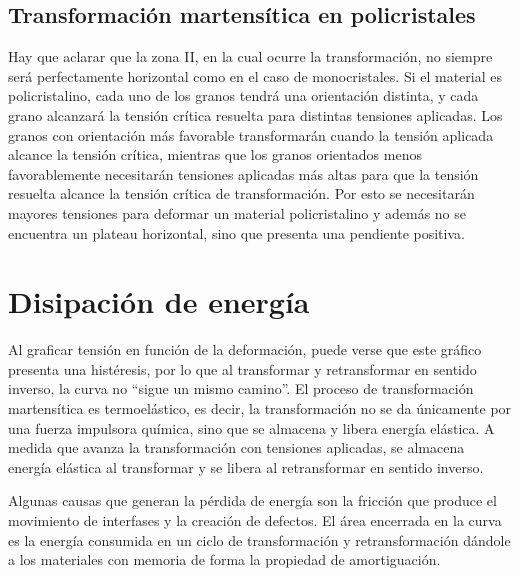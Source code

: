 \documentclass[a4paper,12pt,fleqn,twoside,openany]{book}
\begin{document}
\subsection{Transformación martensítica en policristales}
Hay que aclarar que la zona II, en la cual ocurre la transformación, no siempre será perfectamente horizontal como en el caso de monocristales. 
Si el material es policristalino, cada uno de los granos tendrá una orientación distinta, y cada grano alcanzará la tensión crítica resuelta para distintas tensiones aplicadas. Los granos con orientación más favorable transformarán cuando la tensión aplicada alcance la tensión crítica, mientras que los granos orientados menos favorablemente necesitarán tensiones aplicadas más altas para que la tensión resuelta alcance la tensión crítica de transformación. Por esto se necesitarán mayores tensiones para deformar un material policristalino y además no se encuentra un plateau horizontal, sino que presenta una pendiente positiva.


\section{Disipación de energía}

Al graficar tensión en función de la deformación, puede verse que este gráfico presenta una histéresis, por lo que al transformar y 
retransformar en sentido inverso, la curva no “sigue un mismo camino”. El proceso de transformación martensítica es termoelástico, es decir, la transformación 
no se da únicamente por una fuerza impulsora química, sino que se almacena y libera energía elástica. A medida que avanza la transformación con tensiones aplicadas, 
se almacena energía elástica al transformar y se libera al retransformar en sentido inverso. 

Algunas causas que generan la pérdida de energía son la fricción que produce el 
movimiento de interfases y la creación de defectos. El área encerrada en la curva es la energía consumida en un ciclo de transformación y retransformación dándole a los 
materiales con memoria de forma la propiedad de amortiguación.


\end{document}

